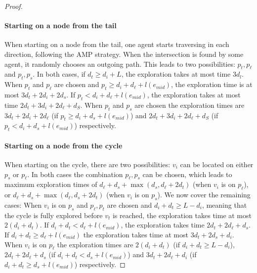 \begin{proof}
\paragraph*{Starting on a node from the tail}

When starting on a node from the tail, one agent starts traversing in each direction, following the AMP strategy. When the intersection is found by
some agent, it randomly chooses an outgoing path. This leads to two possibilities: $p_t, p_\ell$ and $p_t, p_s$. In both cases, if $d_t \geq d_i + L$,
the exploration takes at most time $3d_l$. When $p_t$ and $p_\ell$ are chosen and $p_t \geq d_i + d_\ell + l(e_{mid})$, the exploration time is at most 
$3d_t + 2d_i + 2d_s$. If $p_t < d_i + d_\ell + l(e_{mid})$, the exploration takes at most time $2d_t + 3d_i + 2d_\ell + d_S$. When $p_t$ and $p_s$ are chosen
the exploration times are $3d_t + 2d_i + 2d_\ell$ (if $p_t \geq d_i + d_s + l(e_{mid})$) and $2d_t + 3d_i + 2d_\ell + d_S$ (if $p_t < d_i + d_s + l(e_{mid})$) respectively.

\paragraph*{Starting on a node from the cycle}

When starting on the cycle, there are two possibilities: $v_i$ can be located on either $p_s$ or $p_\ell$. In both cases the combination $p_\ell, p_s$ can be chosen,
which leads to maximum exploration times of $d_\ell + d_s + \max(d_s, d_\ell + 2d_t)$ (when $v_i$ is on $p_\ell$), or $d_\ell + d_s + \max(d_\ell, d_s + 2d_t)$ (when $v_i$ is on $p_s$).
We now cover the remaining cases: When $v_i$ is on $p_s$ and $p_\ell, p_t$ are chosen and $d_i + d_t \geq L - d_i$, meaning that the cycle is fully
explored before $v_t$ is reached, the exploration takes time at most $2(d_i + d_t)$. If $d_i + d_t < d_\ell + l(e_{mid})$, the exploration takes time $2d_t + 2d_\ell + d_s$.
If $d_i + d_t \geq d_\ell + l(e_{mid})$ the exploration takes time at most $3d_t + 2d_s + d_i$. When $v_i$ is on $p_\ell$ the exploration times are 
$2(d_i + d_t)$ (if $d_i + d_t \geq L - d_i$), $2d_t + 2d_\ell + d_s$ (if $d_i + d_t < d_s + l(e_{mid})$) and $3d_t + 2d_\ell + d_i$ (if $d_i + d_t \geq d_s + l(e_{mid})$) respectively.



\end{proof}
